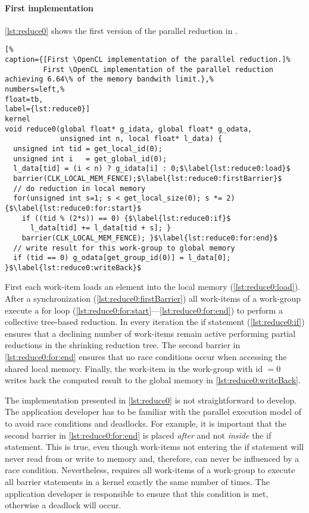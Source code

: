 \paragraph{First \OpenCL implementation}
\autoref{lst:reduce0} shows the first version of the parallel reduction in \OpenCL.
%
\begin{lstlisting}[%
caption={[First \OpenCL implementation of the parallel reduction.]%
         First \OpenCL implementation of the parallel reduction achieving 6.64\% of the memory bandwith limit.},%
numbers=left,%
float=tb,
label={lst:reduce0}]
kernel
void reduce0(global float* g_idata, global float* g_odata,
             unsigned int n, local float* l_data) {
  unsigned int tid = get_local_id(0);
  unsigned int i   = get_global_id(0);
  l_data[tid] = (i < n) ? g_idata[i] : 0;$\label{lst:reduce0:load}$
  barrier(CLK_LOCAL_MEM_FENCE);$\label{lst:reduce0:firstBarrier}$
  // do reduction in local memory
  for(unsigned int s=1; s < get_local_size(0); s *= 2) {$\label{lst:reduce0:for:start}$
    if ((tid % (2*s)) == 0) {$\label{lst:reduce0:if}$
      l_data[tid] += l_data[tid + s]; }
    barrier(CLK_LOCAL_MEM_FENCE); }$\label{lst:reduce0:for:end}$
  // write result for this work-group to global memory
  if (tid == 0) g_odata[get_group_id(0)] = l_data[0]; }$\label{lst:reduce0:writeBack}$
\end{lstlisting}
First each work-item loads an element into the local memory (\autoref{lst:reduce0:load}).
After a synchronization (\autoref{lst:reduce0:firstBarrier}) all work-items of a work-group execute a for loop (\autoref{lst:reduce0:for:start}---\autoref{lst:reduce0:for:end}) to perform a collective tree-based reduction.
In every iteration the if statement (\autoref{lst:reduce0:if}) ensures that a declining number of work-items remain active performing partial reductions in the shrinking reduction tree.
The second barrier in \autoref{lst:reduce0:for:end} ensures that no race conditions occur when accessing the shared local memory.
Finally, the work-item in the work-group with id $=0$ writes back the computed result to the global memory in \autoref{lst:reduce0:writeBack}.


The implementation presented in \autoref{lst:reduce0} is not straightforward to develop.
The application developer has to be familiar with the parallel execution model of \OpenCL to avoid race conditions and deadlocks.
For example, it is important that the second barrier in \autoref{lst:reduce0:for:end} is placed \emph{after} and not \emph{inside} the if statement.
This is true, even though work-items not entering the if statement will never read from or write to memory and, therefore, can never be influenced by a race condition.
Nevertheless, \OpenCL requires all work-items of a work-group to execute all barrier statements in a kernel exactly the same number of times.
The application developer is responsible to ensure that this condition is met, otherwise a deadlock will occur.

